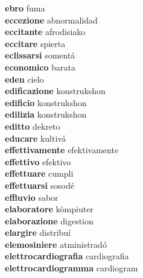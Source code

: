 \textbf{ebro } fuma \\
\textbf{eccezione } abnormalidad \\
\textbf{eccitante } afrodisiako \\
\textbf{eccitare } spierta \\
\textbf{eclissarsi } somentá \\
\textbf{economico } barata \\
\textbf{eden } cielo \\
\textbf{edificazione } konstrukshon \\
\textbf{edificio } konstrukshon \\
\textbf{edilizia } konstrukshon \\
\textbf{editto } dekreto \\
\textbf{educare } kultivá \\
\textbf{effettivamente } efektivamente \\
\textbf{effettivo } efektivo \\
\textbf{effettuare } cumpli \\
\textbf{effettuarsi } sosodé \\
\textbf{effluvio } sabor \\
\textbf{elaboratore } kòmpiuter \\
\textbf{elaborazione } digestion \\
\textbf{elargire } distribuí \\
\textbf{elemosiniere } atministradó \\
\textbf{elettrocardiografia } cardiografia \\
\textbf{elettrocardiogramma } cardiogram \\

